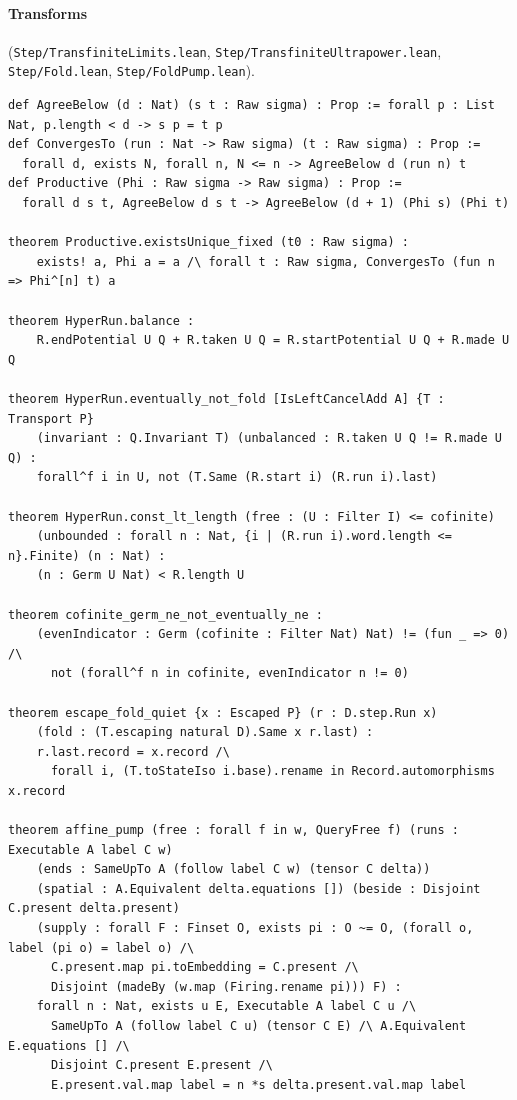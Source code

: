 \documentclass[]{article}
\theoremstyle{definition}
\theoremstyle{remark}
\newcommand{\lpath}[1]{{\ttfamily\nolinkurl{#1}}}
\newcommand{\step}[1]{\lpath{Step/#1.lean}}
\begin{document}
\paragraph{Transforms} (\step{TransfiniteLimits}, \step{TransfiniteUltrapower}, \step{Fold},
\step{FoldPump}).
\begin{lstlisting}
def AgreeBelow (d : Nat) (s t : Raw sigma) : Prop := forall p : List Nat, p.length < d -> s p = t p
def ConvergesTo (run : Nat -> Raw sigma) (t : Raw sigma) : Prop :=
  forall d, exists N, forall n, N <= n -> AgreeBelow d (run n) t
def Productive (Phi : Raw sigma -> Raw sigma) : Prop :=
  forall d s t, AgreeBelow d s t -> AgreeBelow (d + 1) (Phi s) (Phi t)

theorem Productive.existsUnique_fixed (t0 : Raw sigma) :
    exists! a, Phi a = a /\ forall t : Raw sigma, ConvergesTo (fun n => Phi^[n] t) a

theorem HyperRun.balance :
    R.endPotential U Q + R.taken U Q = R.startPotential U Q + R.made U Q

theorem HyperRun.eventually_not_fold [IsLeftCancelAdd A] {T : Transport P}
    (invariant : Q.Invariant T) (unbalanced : R.taken U Q != R.made U Q) :
    forall^f i in U, not (T.Same (R.start i) (R.run i).last)

theorem HyperRun.const_lt_length (free : (U : Filter I) <= cofinite)
    (unbounded : forall n : Nat, {i | (R.run i).word.length <= n}.Finite) (n : Nat) :
    (n : Germ U Nat) < R.length U

theorem cofinite_germ_ne_not_eventually_ne :
    (evenIndicator : Germ (cofinite : Filter Nat) Nat) != (fun _ => 0) /\
      not (forall^f n in cofinite, evenIndicator n != 0)

theorem escape_fold_quiet {x : Escaped P} (r : D.step.Run x)
    (fold : (T.escaping natural D).Same x r.last) :
    r.last.record = x.record /\
      forall i, (T.toStateIso i.base).rename in Record.automorphisms x.record

theorem affine_pump (free : forall f in w, QueryFree f) (runs : Executable A label C w)
    (ends : SameUpTo A (follow label C w) (tensor C delta))
    (spatial : A.Equivalent delta.equations []) (beside : Disjoint C.present delta.present)
    (supply : forall F : Finset O, exists pi : O ~= O, (forall o, label (pi o) = label o) /\
      C.present.map pi.toEmbedding = C.present /\
      Disjoint (madeBy (w.map (Firing.rename pi))) F) :
    forall n : Nat, exists u E, Executable A label C u /\
      SameUpTo A (follow label C u) (tensor C E) /\ A.Equivalent E.equations [] /\
      Disjoint C.present E.present /\
      E.present.val.map label = n *s delta.present.val.map label
\end{lstlisting}
\end{document}

